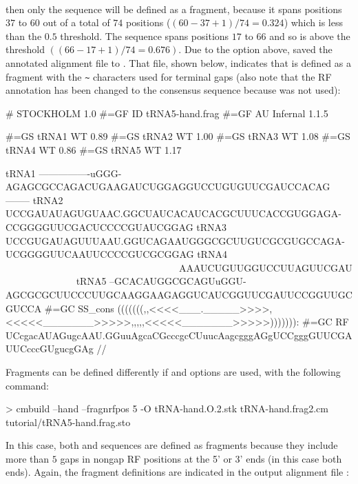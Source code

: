 \\

then only the  sequence will be defined as a fragment,
because it spans positions $37$ to $60$ out of a total of $74$
positions ($(60-37+1)/74 = 0.324$) which is less than the $0.5$
threshold. The  sequence spans positions $17$ to $66$ and
so is above the threshold $((66-17+1)/74 = 0.676)$. Due to the 
option above,  saved the annotated alignment file to 
. That file, shown below, indicates that  is
defined as a fragment with the \verb+~+ characters used for terminal gaps (also note that
the RF annotation has been changed to the consensus sequence because
 was not used):

\newpage

\begin{sreoutput}
# STOCKHOLM 1.0
#=GF ID tRNA5-hand.frag
#=GF AU Infernal 1.1.5

#=GS tRNA1 WT 0.89
#=GS tRNA2 WT 1.00
#=GS tRNA3 WT 1.08
#=GS tRNA4 WT 0.86
#=GS tRNA5 WT 1.17

tRNA1        ----------------uGGG-AGAGCGCCAGACUGAAGAUCUGGAGGUCCUGUGUUCGAUCCACAG--------
tRNA2        UCCGAUAUAGUGUAAC.GGCUAUCACAUCACGCUUUCACCGUGGAGA-CCGGGGUUCGACUCCCCGUAUCGGAG
tRNA3        UCCGUGAUAGUUUAAU.GGUCAGAAUGGGCGCUUGUCGCGUGCCAGA-UCGGGGUUCAAUUCCCCGUCGCGGAG
tRNA4        ~~~~~~~~~~~~~~~~~~~~~~~~~~~~~~~~~~~~AAAUCUGUUGGUCCUUAGUUCGAU~~~~~~~~~~~~~~
tRNA5        --GCACAUGGCGCAGUuGGU-AGCGCGCUUCCCUUGCAAGGAAGAGGUCAUCGGUUCGAUUCCGGUUGCGUCCA
#=GC SS_cons (((((((,,<<<<___._____>>>>,<<<<<_______>>>>>,,,,,<<<<<_______>>>>>))))))):
#=GC RF      UCcgacAUAGugcAAU.GGuuAgcaCGcccgcCUuucAagcgggAGgUCCgggGUUCGAUUCcccGUgucgGAg
//
\end{sreoutput}

Fragments can be defined differently if  and
 options are used, with the following command:

\begin{widesreoutput}
> cmbuild --hand --fragnrfpos 5 -O tRNA-hand.O.2.stk tRNA-hand.frag2.cm tutorial/tRNA5-hand.frag.sto
\end{widesreoutput}
  
In this case, both  and  sequences are defined as
fragments because they include more than $5$ gaps in nongap RF positions
at the 5' or 3' ends (in this case both ends). Again, the fragment
definitions are indicated in the output alignment file
:

